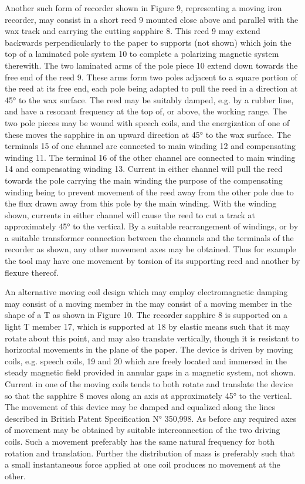 \documentclass[11pt]{article}
\begin{document}
\begin{multicols*}{2}
Another such form of recorder shown in Figure 9, representing a moving iron recorder, may consist in a short reed 9 mounted close above and parallel with the wax track and carrying the cutting sapphire 8. This reed 9 may extend backwards perpendicularly to the paper to supports (not shown) which join the top of a laminated pole system 10 to complete a polarizing magnetic system therewith. The two laminated arms of the pole piece 10 extend down towards the free end of the reed 9. These arms form two poles adjacent to a square portion of the reed at its free end, each pole being adapted to pull the reed in a direction at 45° to the wax surface. The reed may be suitably damped, e.g. by a rubber line, and have a resonant frequency at the top of, or above, the working range. The two pole pieces may be wound with speech coils, and the energization of one of these moves the sapphire in an upward direction at 45° to the wax surface. The terminals 15 of one channel are connected to main winding 12 and compensating winding 11. The terminal 16 of the other channel are connected to main winding 14 and compensating winding 13. Current in either channel will pull the reed towards the pole carrying the main winding the purpose of the compensating winding being to prevent movement of the reed away from the other pole due to the flux drawn away from this pole by the main winding. With the winding shown, currents in either channel will cause the reed to cut a track at approximately 45° to the vertical. By a suitable rearrangement of windings, or by a suitable transformer connection between the channels and the terminals of the recorder as shown, any other movement axes may be obtained. Thus for example the tool may have one movement by torsion of its supporting reed and another by flexure thereof.

An alternative moving coil design which may employ electromagnetic damping may consist of a moving member in the may consist of a moving member in the shape of a T as shown in Figure 10. The recorder sapphire 8 is supported on a light T member 17, which is supported at 18 by elastic means such that it may rotate about this point, and may also translate vertically, though it is resistant to horizontal movements in the plane of the paper. The device is driven by moving coils, e.g. speech coils, 19 and 20 which are freely located and immersed in the steady magnetic field provided in annular gaps in a magnetic system, not shown. Current in one of the moving coils tends to both rotate and translate the device so that the sapphire 8 moves along an axis at approximately 45° to the vertical. The movement of this device may be damped and equalized along the lines described in British Patent Specification N° 350,998. As before any required axes of movement may be obtained by suitable interconnection of the two driving coils. Such a movement preferably has the same natural frequency for both rotation and translation. Further the distribution of mass is preferably such that a small instantaneous force applied at one coil produces no movement at the other.


\end{multicols*}
\end{document}
